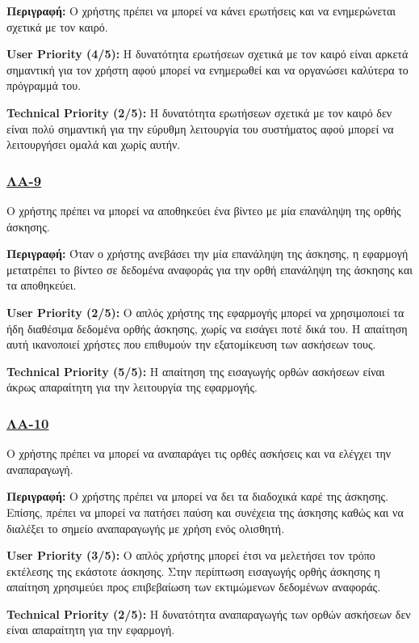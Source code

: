 \noindent\textbf{Περιγραφή:} Ο χρήστης πρέπει να μπορεί να κάνει ερωτήσεις και να ενημερώνεται σχετικά με τον καιρό.

\noindent\textbf{User Priority (4/5):} Η δυνατότητα ερωτήσεων σχετικά με τον καιρό είναι αρκετά σημαντική για τον χρήστη αφού μπορεί να ενημερωθεί και να οργανώσει καλύτερα το πρόγραμμά του.

\noindent\textbf{Technical Priority (2/5):} Η δυνατότητα ερωτήσεων σχετικά με τον καιρό δεν είναι πολύ σημαντική για την εύρυθμη λειτουργία του συστήματος αφού μπορεί να λειτουργήσει ομαλά και χωρίς αυτήν.

\subsubsection{\underline{ΛΑ-9}}
\noindent Ο χρήστης πρέπει να μπορεί να αποθηκεύει ένα βίντεο με μία επανάληψη της ορθής άσκησης.

\noindent\textbf{Περιγραφή:} Όταν ο χρήστης ανεβάσει την μία επανάληψη της άσκησης, η εφαρμογή μετατρέπει το βίντεο σε δεδομένα αναφοράς για την ορθή επανάληψη της άσκησης και τα αποθηκεύει.

\noindent\textbf{User Priority (2/5):} Ο απλός χρήστης της εφαρμογής μπορεί να χρησιμοποιεί τα ήδη διαθέσιμα δεδομένα ορθής άσκησης, χωρίς να εισάγει ποτέ δικά του. Η απαίτηση αυτή ικανοποιεί χρήστες που επιθυμούν την εξατομίκευση των ασκήσεων τους.

\noindent\textbf{Technical Priority (5/5):} Η απαίτηση της εισαγωγής ορθών ασκήσεων είναι άκρως απαραίτητη για την λειτουργία της εφαρμογής.

\subsubsection{\underline{ΛΑ-10}}
\noindent Ο χρήστης πρέπει να μπορεί να αναπαράγει τις ορθές ασκήσεις και να ελέγχει την αναπαραγωγή.

\noindent\textbf{Περιγραφή:} Ο χρήστης πρέπει να μπορεί να δει τα διαδοχικά καρέ της άσκησης. Επίσης, πρέπει να μπορεί να πατήσει παύση και συνέχεια της άσκησης καθώς και να διαλέξει το σημείο αναπαραγωγής με χρήση ενός ολισθητή.

\noindent\textbf{User Priority (3/5):} Ο απλός χρήστης μπορεί έτσι να μελετήσει τον τρόπο εκτέλεσης της εκάστοτε άσκησης. Στην περίπτωση εισαγωγής ορθής άσκησης η απαίτηση χρησιμεύει προς επιβεβαίωση των εκτιμώμενων δεδομένων αναφοράς.

\noindent\textbf{Technical Priority (2/5):} Η δυνατότητα αναπαραγωγής των ορθών ασκήσεων δεν είναι απαραίτητη για την εφαρμογή.

